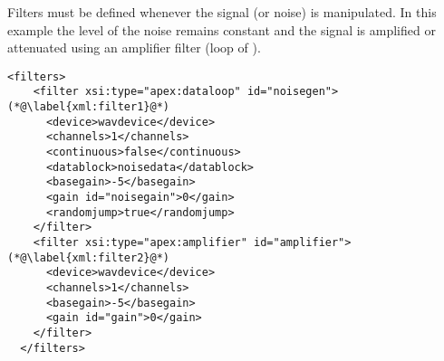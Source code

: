    
 

Filters must be defined whenever the signal (or noise) is
manipulated. In this example the level of the noise remains
constant and the signal is amplified or attenuated using an
amplifier filter (loop of ).

\begin{lstlisting}
<filters>
    <filter xsi:type="apex:dataloop" id="noisegen"> (*@\label{xml:filter1}@*)
      <device>wavdevice</device>
      <channels>1</channels>
      <continuous>false</continuous>
      <datablock>noisedata</datablock>
      <basegain>-5</basegain>
      <gain id="noisegain">0</gain>
      <randomjump>true</randomjump>
    </filter>
    <filter xsi:type="apex:amplifier" id="amplifier">  (*@\label{xml:filter2}@*)
      <device>wavdevice</device>
      <channels>1</channels>
      <basegain>-5</basegain>
      <gain id="gain">0</gain>
    </filter>
  </filters>
\end{lstlisting}

